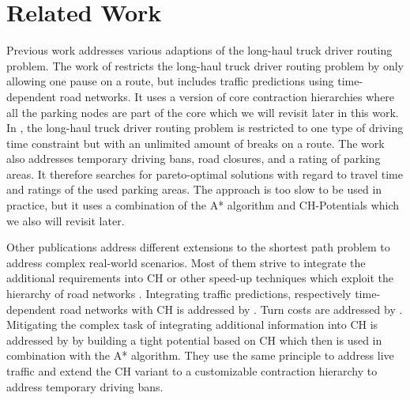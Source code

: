 
\chapter{Related Work\label{ch:related_work}}
Previous work addresses various adaptions of the long-haul truck driver routing problem. The work of \cite{kleff:2017} restricts the long-haul truck driver routing problem by only allowing one pause on a route, but includes traffic predictions using time-dependent road networks. It uses a version of core contraction hierarchies where all the parking nodes are part of the core which we will revisit later in this work. In \cite{kleff:2020}, the long-haul truck driver routing problem is restricted to one type of driving time constraint but with an unlimited amount of breaks on a route. The work also addresses temporary driving bans, road closures, and a rating of parking areas. It therefore searches for pareto-optimal solutions with regard to travel time and ratings of the used parking areas. The approach is too slow to be used in practice, but it uses a combination of the A* algorithm and CH-Potentials which we also will revisit later.

Other publications address different extensions to the shortest path problem to address complex real-world scenarios. Most of them strive to integrate the additional requirements into CH or other speed-up techniques which exploit the hierarchy of road networks \cite{bast:2015}. Integrating traffic predictions, respectively time-dependent road networks with CH is addressed by \cite{batz:2009,batz:2013}. Turn costs are addressed by \cite{geisberger:2011}. Mitigating the complex task of integrating additional information into CH is addressed by \cite{strasser:2021} by building a tight potential based on CH which then is used in combination with the A* algorithm. They use the same principle to address live traffic and extend the CH variant to a customizable contraction hierarchy \cite{dibbelt:2015} to address temporary driving bans.

\cite{sartori:20210107}


\cite{mayerle:2020}

\cite{tuin:2018}

\cite{bomsdorf:2020}